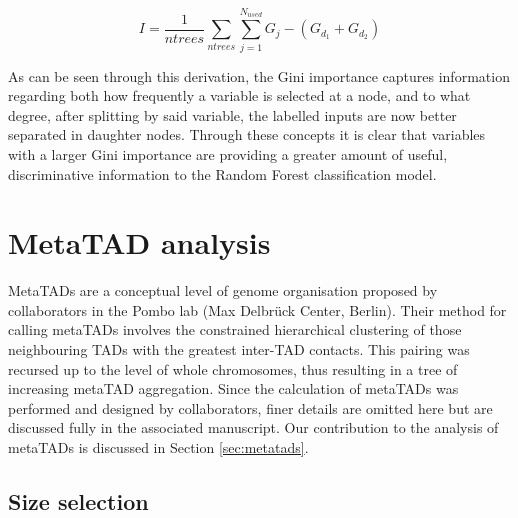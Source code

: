 \documentclass[a4paper,11pt,oneside]{book}
\begin{document}
\begin{equation}\label{eqn:giniimportance}
I = \frac{1}{ntrees} \sum_{ntrees} \sum_{j=1}^{N_{used}} G_{j} - (G_{d_1} + G_{d_2})
\end{equation}

As can be seen through this derivation, the Gini importance captures information regarding both how frequently a variable is selected at a node, and to what degree, after splitting by said variable, the labelled inputs are now better separated in daughter nodes. Through these concepts it is clear that variables with a larger Gini importance are providing a greater amount of useful, discriminative information to the Random Forest classification model.

\section{MetaTAD analysis}\label{meth:meta}

MetaTADs are a conceptual level of genome organisation proposed by collaborators in the Pombo lab (Max Delbr\"{u}ck Center, Berlin). Their method for calling metaTADs involves the constrained hierarchical clustering of those neighbouring TADs with the greatest inter-TAD contacts. This pairing was recursed up to the level of whole chromosomes, thus resulting in a tree of increasing metaTAD aggregation. Since the calculation of metaTADs was performed and designed by collaborators, finer details are omitted here but are discussed fully in the associated manuscript.\cite{fraser2015inrev} Our contribution to the analysis of metaTADs is discussed in Section \ref{sec:metatads}.



\subsection{Size selection}\label{sec:metatad}
\end{document}
